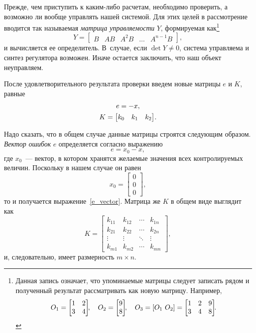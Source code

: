 \documentclass[12pt,a4paper,openany]{extarticle}
\begin{document}
Прежде, чем приступить к каким-либо расчетам, необходимо проверить, а возможно ли вообще управлять нашей системой.
Для этих целей в рассмотрение вводится так называемая \textit{матрица управляемости} $Y$\!, формируемая как\footnote{Данная запись означает, что упоминаемые матрицы следует записать рядом и полученный результат рассматривать как новую матрицу.
Например,
\begin{equation*}
	O_1=
	\begin{bmatrix}
		1 & 2\\
		3 & 4
	\end{bmatrix}\!\!,\quad
	O_2=
	\begin{bmatrix}
		9\\
		8 
	\end{bmatrix}\!\!,\quad
	O_3 = [O_1\ O_2] =
	\begin{bmatrix}
		1 & 2 & 9\\
		3 & 4 & 8
	\end{bmatrix}\!\!\ldotp
\end{equation*}}
\begin{equation}
	Y = 
	\begin{bmatrix}
		B & AB & A^2B & \dots & A^{n-1}B
	\end{bmatrix}\!\!,	 
\end{equation}
и вычисляется ее определитель. 
В~случае, если $\det Y\ne0$, система управляема и синтез регулятора возможен. 
Иначе остается заключить, что наш объект неуправляем.

После удовлетворительного результата проверки введем новые матрицы $e$ и $K$, равные
\begin{gather}
	e = -x,\label{e_vector}\\
	K =
	\begin{bmatrix}
		k_0 & k_1 & k_2
	\end{bmatrix}\!\ldotp
\end{gather}

Надо сказать, что в общем случае данные матрицы строятся следующим образом.
\textit{Вектор ошибок} $e$ определяется согласно выражению
\begin{equation}
	e = x_0-x,
\end{equation}
где $x_0$~--- вектор, в котором хранятся желаемые значения всех контролируемых величин.
Поскольку в нашем случае он равен
\begin{equation}
	x_0 = 
	\begin{bmatrix}
		0\\0\\0
	\end{bmatrix}\!\!,
\end{equation}
то и получается выражение~\eqref{e_vector}.
Матрица же $K$ в общем виде выглядит как
\begin{equation}
	K =
	\begin{bmatrix}
		k_{11} & k_{12} & \cdots & k_{1n} \\
		k_{21} & k_{22} & \cdots & k_{2n} \\
		\vdots & \vdots & \ddots & \vdots \\
		k_{m1} & k_{m2} & \cdots & k_{mn}
	\end{bmatrix}\!\!,
\end{equation}
и, следовательно, имеет размерность $m\times n$.
\end{document}
